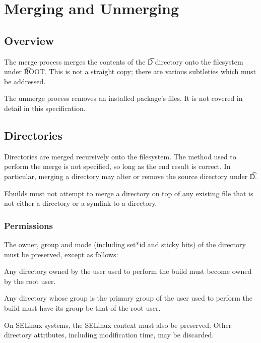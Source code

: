 \chapter{Merging and Unmerging}


\section{Overview}

The merge process merges the contents of the \t{D} directory onto the filesystem under \t{ROOT}.
This is not a straight copy; there are various subtleties which must be addressed.

The unmerge process removes an installed package's files. It is not covered in detail in this
specification.

\section{Directories}

Directories are merged recursively onto the filesystem. The method used to perform the merge is not
specified, so long as the end result is correct. In particular, merging a directory may alter or
remove the source directory under \t{D}.

Ebuilds must not attempt to merge a directory on top of any existing file that is not either a
directory or a symlink to a directory.

\subsection{Permissions}

The owner, group and mode (including set*id and sticky bits) of the directory must be preserved,
except as follows:

\begin{compactitem}
\item Any directory owned by the user used to perform the build must become owned by the root user.
\item Any directory whose group is the primary group of the user used to perform the build must have
    its group be that of the root user.
\end{compactitem}

On SELinux systems, the SELinux context must also be preserved. Other directory attributes, including
modification time, may be discarded.

